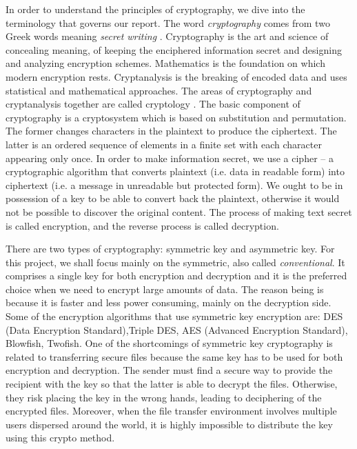 In order to understand the principles of cryptography, we dive into the terminology that governs our report. The word \emph{cryptography} comes from two Greek words meaning \emph{secret writing} \cite{wikicrypto}. Cryptography is the art and science of concealing meaning, of keeping the enciphered information secret and designing and analyzing encryption schemes. Mathematics is the foundation on which modern encryption rests. Cryptanalysis is the breaking of encoded data and uses statistical and mathematical approaches. The areas of cryptography and cryptanalysis together are called cryptology \cite{wikicrypto}. The basic component of cryptography is a cryptosystem which is based on substitution and permutation. The former changes characters in the plaintext to produce the ciphertext. The latter is an ordered sequence of elements in a finite set with each character appearing only once. In order to make information secret, we use a cipher – a cryptographic algorithm that converts plaintext (i.e. data in readable form) into ciphertext (i.e. a message in unreadable but protected form). We ought to be in possession of a key to be able to convert back the plaintext, otherwise it would not be possible to discover the original content. The process of making text secret is called encryption, and the reverse process is called decryption.

There are two types of cryptography: symmetric key and asymmetric key. For this project, we shall focus mainly on the symmetric, also called \emph{conventional}. It comprises a single key for both encryption and decryption and it is the preferred choice when we need to encrypt large amounts of data. The reason being is because it is faster and less power consuming, mainly on the decryption side. Some of the encryption algorithms that use symmetric key encryption are: DES (Data Encryption Standard),Triple DES, AES (Advanced Encryption Standard), Blowfish, Twofish. One of the shortcomings of symmetric key cryptography is related to transferring secure files because the same key has to be used for both encryption and decryption. The sender must find a secure way to provide the recipient with the key so that the latter is able to decrypt the files. Otherwise, they risk placing the key in the wrong hands, leading to deciphering of the encrypted files. Moreover, when the file transfer environment involves multiple users dispersed around the world, it is highly impossible to distribute the key using this crypto method. 

